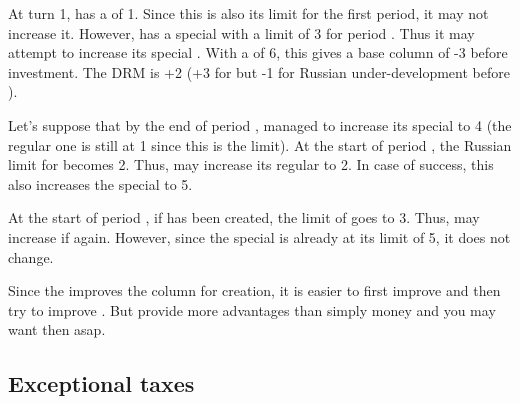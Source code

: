 \begin{exemple}
  At turn 1, \RUS has a \FTI of 1. Since this is also its limit for the first
  period, it may not increase it. However, \RUS has a special \FTI with a
  limit of 3 for period . Thus it may attempt to increase its
  special \FTI. With a \ADM of 6, this gives a base column of -3 before
  investment. The DRM is +2 (+3 for \STAB but -1 for Russian under-development
  before ).

  Let's suppose that by the end of period , \RUS managed to increase
  its special \FTI to 4 (the regular one is still at 1 since this is the
  limit). At the start of period , the Russian limit for \FTI
  becomes 2. Thus, \RUS may increase its regular \FTI to 2. In case of
  success, this also increases the special \FTI to 5.

  At the start of period , if  has been
  created, the limit of \FTI goes to 3. Thus, \RUS may increase if
  again. However, since the special \FTI is already at its limit of 5, it does
  not change.
\end{exemple}


\begin{playtip}
  Since the \DTI improves the column for \MNU creation, it is easier to first
  improve \DTI and then try to improve \MNU. But \MNU provide more advantages
  than simply money and you may want then asap.
\end{playtip}



\subsection{Exceptional taxes}\label{chExpenses:Exceptional Taxes}

